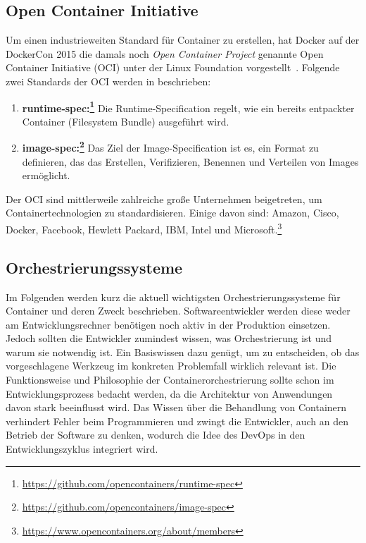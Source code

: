 \subsection{Open Container Initiative}
\label{sec:open-container-initiative}
Um einen industrieweiten Standard für Container zu erstellen, hat Docker auf der DockerCon 2015 die damals noch \emph{Open Container Project} genannte Open Container Initiative (OCI) unter der Linux Foundation vorgestellt~\autocite{docker-ocp:online}.
Folgende zwei Standards der OCI werden in \autocite{oci-about:online} beschrieben:
\begin{enumerate}
    \item \textbf{runtime-spec:\footnote{\url{https://github.com/opencontainers/runtime-spec}}} Die Runtime-Specification regelt, wie ein bereits entpackter Container (Filesystem Bundle) ausgeführt wird.
    \item \textbf{image-spec:\footnote{\url{https://github.com/opencontainers/image-spec}}} Das Ziel der Image-Specification ist es, ein Format zu definieren, das das Erstellen, Verifizieren, Benennen und Verteilen von Images ermöglicht.
\end{enumerate}
Der OCI sind mittlerweile zahlreiche große Unternehmen beigetreten, um Containertechnologien zu standardisieren. Einige davon sind: Amazon, Cisco, Docker, Facebook, Hewlett Packard, IBM, Intel und Microsoft.\footnote{\url{https://www.opencontainers.org/about/members}}

\subsection{Orchestrierungssysteme}
\label{sec:orchestrierungssysteme}
Im Folgenden werden kurz die aktuell wichtigsten Orchestrierungssysteme für Container \autocite{ix-orchestrierung-2017} und deren Zweck beschrieben.
Softwareentwickler werden diese weder am Entwicklungsrechner benötigen noch aktiv in der Produktion einsetzen.
Jedoch sollten die Entwickler zumindest wissen, was Orchestrierung ist und warum sie notwendig ist.
Ein Basiswissen dazu genügt, um zu entscheiden, ob das vorgeschlagene Werkzeug im konkreten Problemfall wirklich relevant ist.
Die Funktionsweise und Philosophie der Containerorchestrierung sollte schon im Entwicklungsprozess bedacht werden, da die Architektur von Anwendungen davon stark beeinflusst wird.
Das Wissen über die Behandlung von Containern verhindert Fehler beim Programmieren und zwingt die Entwickler, auch an den Betrieb der Software zu denken, wodurch die Idee des DevOps in den Entwicklungszyklus integriert wird.

